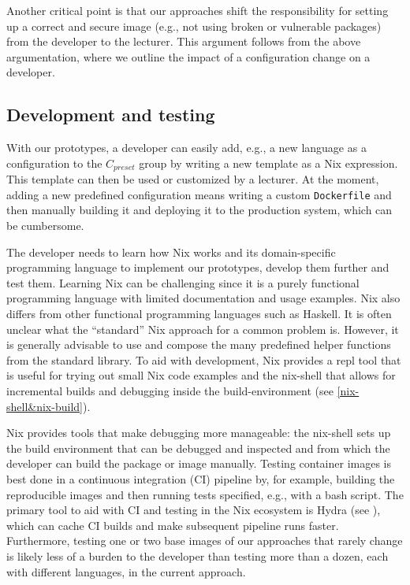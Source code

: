 Another critical point is that our approaches shift the responsibility for setting up a correct and secure image (e.g., not using broken or vulnerable packages) from the developer to the lecturer. This argument follows from the above argumentation, where we outline the impact of a configuration change on a developer. 

\subsection{Development and testing}
With our prototypes, a developer can easily add, e.g., a new language as a configuration to the $C_{preset}$ group by writing a new template as a Nix expression. This template can then be used or customized by a lecturer. At the moment, adding a new predefined configuration means writing a custom \verb|Dockerfile| and then manually building it and deploying it to the production system, which can be cumbersome.

The developer needs to learn how Nix works and its domain-specific programming language to implement our prototypes, develop them further and test them. Learning Nix can be challenging since it is a purely functional programming language with limited documentation and usage examples. Nix also differs from other functional programming languages such as Haskell. It is often unclear what the ``standard'' Nix approach for a common problem is. However, it is generally advisable to use and compose the many predefined helper functions from the standard library. To aid with development, Nix provides a repl tool that is useful for trying out small Nix code examples and the nix-shell that allows for incremental builds and debugging inside the build-environment (see \ref{nix-shell&nix-build}). 

Nix provides tools that make debugging more manageable: the nix-shell sets up the build environment that can be debugged and inspected and from which the developer can build the package or image manually. Testing container images is best done in a continuous integration (CI) pipeline by, for example, building the reproducible images and then running tests specified, e.g., with a bash script. The primary tool to aid with CI and testing in the Nix ecosystem is Hydra (see \cite{Hydra}), which can cache CI builds and make subsequent pipeline runs faster. Furthermore, testing one or two base images of our approaches that rarely change is likely less of a burden to the developer than testing more than a dozen, each with different languages, in the current approach. 

